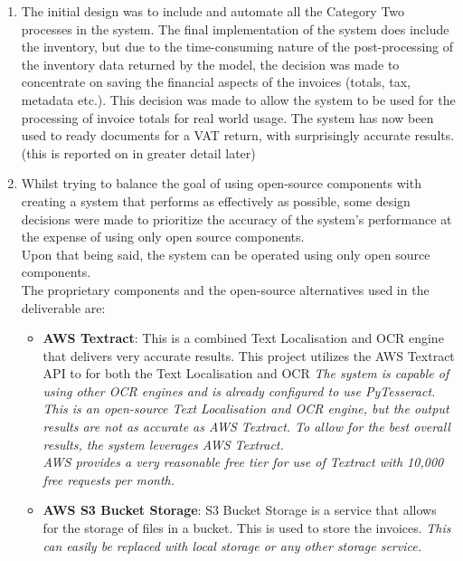 \begin{enumerate}
	\item The initial design was to include and automate all the Category Two processes in the
	      system. The final implementation of the system does include the inventory, but due to the time-consuming nature of the post-processing of the
	      inventory data returned by the model, the decision was made to concentrate on saving the financial aspects
	      of the invoices (totals, tax, metadata etc.). This decision was made to allow the system to be used for the processing of invoice totals for
	      real world usage. The system has now been used to ready documents for a VAT return, with surprisingly accurate results.
	      (this is reported on in greater detail later)
	\item Whilst trying to balance the goal of using open-source components with creating a system that performs as effectively as possible, some
	      design decisions were made to prioritize the accuracy of the system's performance at the expense of using only open source components.\\ 
		  Upon that being said, the system can be operated using only open source components.\\
	      The proprietary components and the open-source alternatives used in the deliverable are:
	      \begin{itemize}
		      \item \textbf{AWS Textract}: This is a combined Text Localisation and OCR engine that delivers very accurate results. This project
		            utilizes the AWS Textract API to for both the Text Localisation and OCR
					\bigbreak
					\emph{The system is capable of using other OCR engines and is already configured to use PyTesseract. This is an open-source Text 
					Localisation and OCR engine, but the output results are not as accurate as AWS Textract. To allow for the best overall results, 
					the system leverages AWS Textract.\\ AWS provides a very reasonable free tier for use of Textract with 10,000 free requests per month.}
		      \item \textbf{AWS S3 Bucket Storage}: S3 Bucket Storage is a service that allows for the storage of files in a bucket. This is used to store the
		            invoices. 
					\bigbreak
					\emph{This can easily be replaced with local storage or any other storage service.}
	      \end{itemize}
\end{enumerate}
